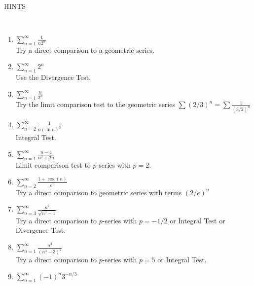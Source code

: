 \documentclass[11pt]{amsart}
\begin{document}
\begin{center}
  \large
  \\
  HINTS
   
\end{center}


\
\medskip
\renewcommand{\labelenumi}{\textbf{\Alph{enumi}.}}
\begin{enumerate}
\setlength\itemsep{19mm}
\item   \qquad $\displaystyle \sum_{n=1}^\infty \frac{1}{n2^n}$\\

Try a direct comparison to a geometric series.
\vfill
\item   \qquad $\displaystyle \sum_{n=1}^\infty 2^{n}$\\

Use the Divergence Test.
\vfill
\item   \qquad $\displaystyle \sum_{n=1}^\infty \frac{n}{2^n}$\\

Try the limit comparison test to the geometric series $\sum (2/3)^n = \sum \frac{1}{(3/2)^n}$
\vfill
\item   \qquad $\displaystyle \sum_{n=2}^\infty \frac{1}{n (\ln n)^3}$\\

Integral Test.
\vfill
\item   \qquad $\displaystyle \sum_{n=1}^\infty \frac{n-4}{n^3+2n}$\\

Limit comparison test to $p$-series with $p=2.$
\vfill
\item   \qquad $\displaystyle \sum_{n=2}^\infty \frac{1+\cos(n)}{e^n}$\\

Try a direct comparison to geometric series with terms $(2/e)^n$
\vfill
\item   \qquad $\displaystyle \sum_{n=3}^\infty \frac{n^2}{\sqrt{n^3-1}}$\\ 

Try a direct comparison to $p$-series with $p=-1/2$ or Integral Test or Divergence Test.
\vfill
\item   \qquad $\displaystyle \sum_{n=1}^\infty \frac{n^3}{(n^4-3)^2}$\\ 

Try a direct comparison to $p$-series with $p=5$ or Integral Test.
\vfill

\item   \qquad $\displaystyle \sum_{n=1}^\infty (-1)^n 3^{-n/3}$\\


\end{enumerate}
\end{document}
